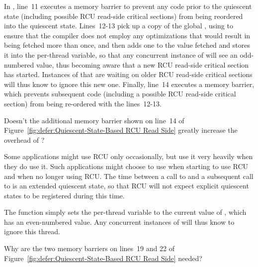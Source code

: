 In , line~11 executes a memory barrier
to prevent any code prior to the quiescent state (including possible
RCU read-side critical sections) from being reordered
into the quiescent state.
Lines~12-13 pick up a copy of the global , using
 to ensure that the compiler does not employ any
optimizations that would result in  being fetched
more than once,
and then adds one to the value fetched and stores it into
the per-thread  variable, so that any concurrent
instance of  will see an odd-numbered value,
thus becoming aware that a new RCU read-side critical section has started.
Instances of  that are waiting on older
RCU read-side critical sections will thus know to ignore this new one.
Finally, line~14 executes a memory barrier, which prevents subsequent
code (including a possible RCU read-side critical section) from being
re-ordered with the lines~12-13.

\QuickQuiz{}
	Doesn't the additional memory barrier shown on line~14 of
	Figure~\ref{fig:defer:Quiescent-State-Based RCU Read Side}
	greatly increase the overhead of ?
 \QuickQuizEnd

Some applications might use RCU only occasionally, but use it very heavily
when they do use it.
Such applications might choose to use  when
starting to use RCU and  when no longer
using RCU.
The time between a call to  and a subsequent
call to  is an extended quiescent state,
so that RCU will not expect explicit quiescent states to be registered
during this time.

The  function simply sets the
per-thread  variable to the current value of
, which has an even-numbered value.
Any concurrent instances of  will thus know to
ignore this thread.

\QuickQuiz{}
	Why are the two memory barriers on lines~19 and 22 of
	Figure~\ref{fig:defer:Quiescent-State-Based RCU Read Side}
	needed?
 \QuickQuizEnd

